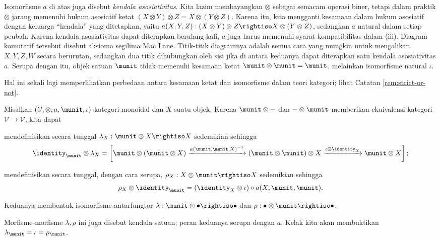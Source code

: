 Isomorfisme $a$ di atas juga disebut \emph{kendala asosiativitas}. Kita lazim membayangkan $\otimes$ sebagai semacam operasi biner, tetapi dalam praktik $\otimes$ jarang memenuhi hukum asosiatif ketat $(X \otimes Y) \otimes Z = X \otimes (Y \otimes Z)$. Karena itu, kita mengganti kesamaan dalam hukum asosiatif dengan keluarga ``kendala'' yang ditetapkan, yaitu $a(X, Y, Z): (X \otimes Y) \otimes Z \rightiso X \otimes (Y \otimes Z)$, sedangkan $a$ natural dalam setiap peubah. Karena kendala asosiativitas dapat diterapkan berulang kali, $a$ juga harus memenuhi syarat kompatibilitas dalam (iii). Diagram komutatif tersebut disebut aksioma segilima Mac Lane. Titik-titik diagramnya adalah semua cara yang mungkin untuk mengalikan $X,Y,Z,W$ secara berurutan, sedangkan dua titik dihubungkan oleh sisi jika di antara keduanya dapat diterapkan satu kendala asosiativitas $a$. Serupa dengan itu, objek satuan $\munit$ tidak memenuhi kesamaan ketat $\munit \otimes \munit = \munit$, melainkan isomorfisme natural $\iota$.

Hal ini sekali lagi memperlihatkan perbedaan antara kesamaan ketat dan isomorfisme dalam teori kategori; lihat Catatan \ref{rem:strict-or-not}.

\begin{definition}\label{def:monoidal-constraints}
	Misalkan $(\mathcal{V}, \otimes, a, \munit, \iota)$ kategori monoidal dan $X$ suatu objek. Karena $\munit \otimes -$ dan $- \otimes \munit$ memberikan ekuivalensi kategori $\mathcal{V} \to \mathcal{V}$, kita dapat
	\begin{compactitem}
		\item mendefinisikan secara tunggal $ \lambda_X: \munit \otimes X \rightiso X$ sedemikian sehingga
			\[ \identity_{\munit} \otimes \lambda_X = \left[ \munit \otimes (\munit \otimes X) \xrightarrow{ a(\munit, \munit, X)^{-1} } (\munit \otimes \munit) \otimes X \xrightarrow{\iota \otimes \identity_X} \munit \otimes X \right] ; \]
		\item mendefinisikan secara tunggal, dengan cara serupa, $\rho_X: X \otimes \munit \rightiso X$ sedemikian sehingga
			\[ \rho_X \otimes \identity_{\munit} = (\identity_X \otimes \iota) \circ a(X, \munit, \munit). \]
	\end{compactitem}
	Keduanya membentuk isomorfisme antarfungtor $\lambda: \munit \otimes \bullet \rightiso \bullet$ dan $\rho: \bullet \otimes \munit \rightiso \bullet$.
\end{definition}
Morfisme-morfisme $\lambda, \rho$ ini juga disebut kendala satuan; peran keduanya serupa dengan $a$. Kelak kita akan membuktikan $\lambda_\munit = \iota = \rho_\munit$.

